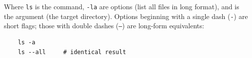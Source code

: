 \documentclass{article}
\newcommand{\code}[1]{\colorbox{codebg}{\texttt{#1}}}
\begin{document}
Where \code{ls} is the command, \code{-la} are options (list all files in long
format), and  is the argument (the target directory).
Options beginning with a single dash (\code{-}) are short flags; those with double
dashes (\code{--}) are long-form equivalents:

\begin{verbatim}
	ls -a
	ls --all     # identical result
\end{verbatim}


	
\end{document}
